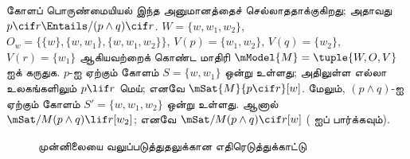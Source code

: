 \documentclass[../../../include/open-logic-section]{subfiles}
\begin{document}
\begin{ex}
  கோளப் பொருண்மையியல் இந்த அனுமானத்தைச் செல்லாததாக்குகிறது; அதாவது $p
  \cif r \Entails/ (p \land q) \cif r$. $W = \{w, w_1, w_2\}$,
  $O_w = \{\{w\}, \{w, w_1\}, \{w, w_1, w_2\}\}$, $V(p) = \{w_1,
  w_2\}$, $V(q) = \{w_2\}$, $V(r) = \{w_1\}$ ஆகியவற்றைக் கொண்ட
  மாதிரி $\mModel{M} = \tuple{W, O, V}$ ஐக் கருதுக. $p$-ஐ ஏற்கும்
  கோளம் $S = \{w, w_1\}$ ஒன்று உள்ளது; அதிலுள்ள எல்லா உலகங்களிலும்
  $p \lif r$ மெய்; எனவே $\mSat{M}{p \cif r}[w]$. மேலும், $(p \land
  q)$-ஐ ஏற்கும் கோளம் $S' = \{w, w_1, w_2\}$ ஒன்று உள்ளது. ஆனால்
  $\mSat/{M}{(p \land q) \lif r}[w_2]$; எனவே $\mSat/{M}{(p \land q)
  \cif r}[w]$ ( ஐப் பார்க்கவும்).

\begin{figure}
\begin{center}
\caption{முன்னிலையை வலுப்படுத்துதலுக்கான எதிரெடுத்துக்காட்டு}
\end{center}
\end{figure}
\end{ex}
\end{document}
